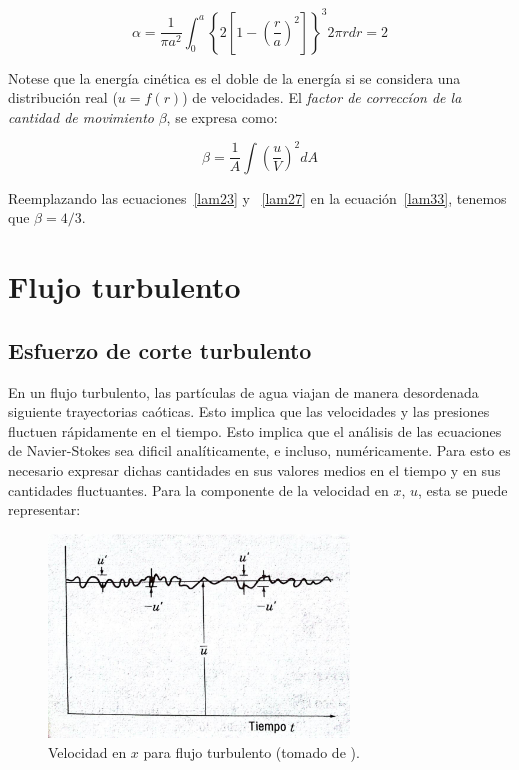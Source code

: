 \documentclass[11pt, oneside]{article}
\begin{document}
\begin{equation}
\alpha = \frac{1}{\pi a^2} \int_0^a \left\{ 2 \left[ 1- \left(\frac{r}{a}\right)^2 \right] \right\}^3 2\pi r dr = 2
\label{lam32}
\end{equation}

Notese que la energ\'ia cin\'etica es el doble de la energ\'ia si se considera una distribuci\'on real ($u=f(r)$) de velocidades. El \emph{factor de correcc\'ion de la cantidad de movimiento} $\beta$, se expresa como:

\begin{equation}
\beta = \frac{1}{A} \int \left ( \frac{u}{V} \right )^2 dA
\label{lam33}
\end{equation}

Reemplazando las ecuaciones~\ref{lam23} y ~\ref{lam27} en la ecuaci\'on~\ref{lam33}, tenemos que $\beta = 4/3$.

\section{Flujo turbulento}
\subsection{Esfuerzo de corte turbulento} %
En un flujo turbulento, las part\'iculas de agua viajan de manera desordenada siguiente trayectorias ca\'oticas. Esto implica que las velocidades y las presiones fluctuen r\'apidamente en el tiempo. Esto implica que el an\'alisis de las ecuaciones de Navier-Stokes sea dificil anal\'iticamente, e incluso, num\'ericamente. Para esto es necesario expresar dichas cantidades en sus valores medios en el tiempo y en sus cantidades fluctuantes. Para la componente de la velocidad en $x$, $u$, esta se puede representar:

\begin{figure}[h]
\centering
\includegraphics[width=8cm]{turb.jpeg}
\caption{Velocidad en $x$ para flujo turbulento (tomado de \cite{streeter}).}
\label{turb}
\end{figure}
\end{document}
